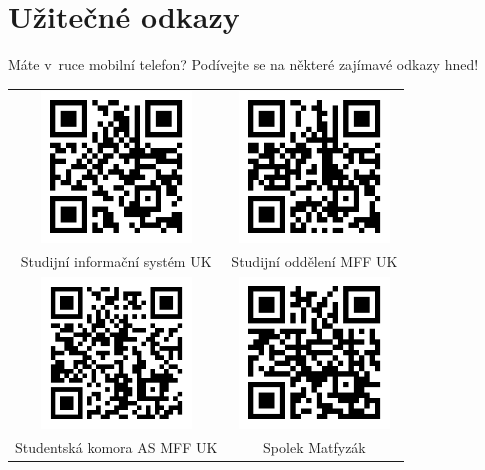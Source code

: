 \newpage
{}
\section*{Užitečné odkazy}
Máte v~ruce mobilní telefon? Podívejte se na některé zajímavé odkazy hned!

\vspace{20mm}

\begin{tabular}{cc}
    \includegraphics[width=4cm]{Images/QR/is.png}&
    \includegraphics[width=4cm]{Images/QR/studijni.png} \\
    Studijní informační systém UK&
    Studijní oddělení MFF UK \\
    
    \includegraphics[width=4cm]{Images/QR/skas.png}&
    \includegraphics[width=4cm]{Images/QR/matfyzak.png} \\
    Studentská komora AS MFF UK &
    Spolek Matfyzák \\


\end{tabular}
